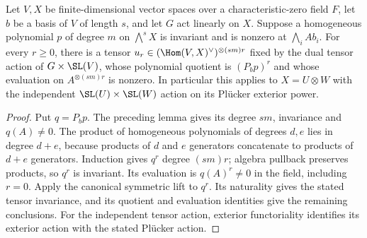 \begin{lemma}
\label{lem:plucker-invariant-tensor}
\leanok
Let $V,X$ be finite-dimensional vector spaces over a characteristic-zero
field $F$, let $b$ be a basis of $V$ of length $s$, and let $G$ act linearly
on $X$. Suppose a homogeneous polynomial $p$ of degree $m$ on
$\bigwedge^s X$ is invariant and is nonzero at $\bigwedge_i A b_i$.
For every $r\ge0$, there is a tensor
$u_r\in(\Hom(V,X)^\vee)^{\otimes (sm)r}$ fixed by the dual tensor action
of $G\times\SL(V)$, whose polynomial quotient is $(P_bp)^r$ and whose
evaluation on $A^{\otimes (sm)r}$ is nonzero.
In particular this applies to $X=U\otimes W$ with the independent
$\SL(U)\times\SL(W)$ action on its Pl\"ucker exterior power.
\end{lemma}
\begin{proof}
Put $q=P_bp$. The preceding lemma gives its degree $sm$, invariance and
$q(A)\ne0$. The product of homogeneous polynomials of degrees $d,e$ lies
in degree $d+e$, because products of $d$ and $e$ generators concatenate
to products of $d+e$ generators. Induction gives $q^r$ degree $(sm)r$;
algebra pullback preserves products, so $q^r$ is invariant. Its evaluation
is $q(A)^r\ne0$ in the field, including $r=0$.
Apply the canonical symmetric lift to $q^r$. Its naturality gives the
stated tensor invariance, and its quotient and evaluation identities give
the remaining conclusions. For the independent tensor action, exterior
functoriality identifies its exterior action with the stated Pl\"ucker action.
\end{proof}

